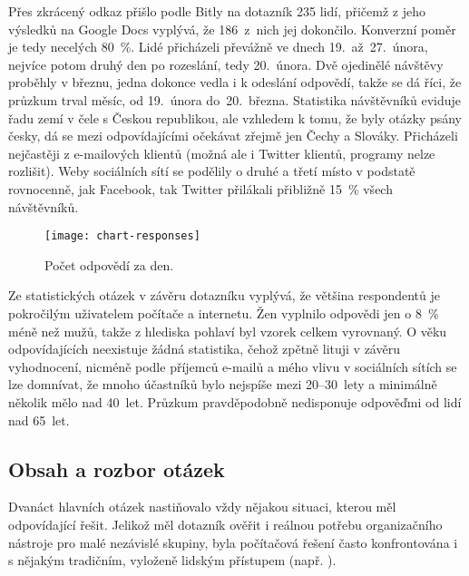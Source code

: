 \documentclass[12pt,oneside,final]{fithesis2}
\begin{document}
Přes zkrácený odkaz přišlo podle Bitly na dotazník 235 lidí, přičemž z jeho výsledků na Google Docs vyplývá, že 186~z~nich jej dokončilo. Konverzní poměr je tedy necelých 80~\%. Lidé přicházeli převážně ve dnech 19.~až~27.~února, nejvíce potom druhý den po rozeslání, tedy 20.~února. Dvě ojedinělé návštěvy proběhly v březnu, jedna dokonce vedla i k odeslání odpovědí, takže se dá říci, že průzkum trval měsíc, od 19.~února do~20.~března. Statistika návštěvníků eviduje řadu zemí v čele s Českou republikou, ale vzhledem k tomu, že byly otázky psány česky, dá se mezi odpovídajícími očekávat zřejmě jen Čechy a Slováky. Přicházeli nejčastěji z e-mailových klientů (možná ale i Twitter klientů, programy nelze rozlišit). Weby sociálních sítí se podělily o druhé a třetí místo v podstatě rovnocenně, jak Facebook, tak Twitter přilákali přibližně 15~\% všech návštěvníků.

\begin{figure}[h]
    \centering
    \texttt{[image: chart-responses]}
    \caption{Počet odpovědí za den.}
\end{figure}

Ze statistických otázek v závěru dotazníku vyplývá, že většina respondentů je pokročilým uživatelem počítače a internetu. Žen vyplnilo odpovědi jen o 8~\% méně než mužů, takže z hlediska pohlaví byl vzorek celkem vyrovnaný. O věku odpovídajících neexistuje žádná statistika, čehož zpětně lituji v závěru vyhodnocení, nicméně podle příjemců e-mailů a mého vlivu v sociálních sítích se lze domnívat, že mnoho účastníků bylo nejspíše mezi 20--30~lety a minimálně několik mělo nad 40~let. Průzkum pravděpodobně nedisponuje odpověďmi od lidí nad 65~let.

\subsection{Obsah a rozbor otázek}
Dvanáct hlavních otázek nastiňovalo vždy nějakou situaci, kterou měl odpovídající řešit. Jelikož měl dotazník ověřit i reálnou potřebu organizačního nástroje pro malé nezávislé skupiny, byla počítačová řešení často konfrontována i s nějakým tradičním, vyloženě lidským přístupem (např. ).
\end{document}
